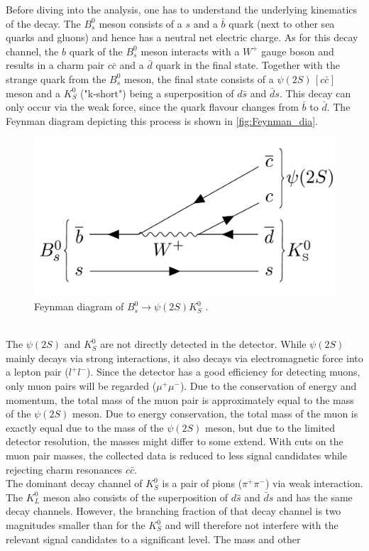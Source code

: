 Before diving into the analysis, one has to understand the underlying kinematics of the decay. The $B_s^0$ meson consists of a $s$ and a $\bar{b}$ quark (next to other sea quarks and gluons) and hence
has a neutral net electric charge. As for this decay channel, the $b$ quark of the $B_s^0$ meson interacts with a $W^+$ gauge boson and results in a charm pair $c \bar{c}$ and a $\bar{d}$ quark in the 
final state. Together with the strange quark from the $B_s^0$ meson, the final state consists of a $\psi (2S) \, [c \bar{c}]$ meson and a $K_S^0$ ("k-short") being a superposition of $d\bar{s}$ and $\bar{d}s$.
This decay can only occur via the weak force, since the quark flavour changes from $\bar{b}$ to $\bar{d}$. The Feynman diagram depicting this process is shown in \autoref{fig:Feynman_dia}.
\begin{figure}
    \centering
    \includegraphics[width = .5\textwidth]{"content/pics/Feynman.png"}
    \caption{Feynman diagram of $B_s^0 \to \psi (2S)K_S^0$ \cite{LHCb_MVA}.}
    \label{fig:Feynman_dia}
  \end{figure}
\\The $\psi (2S)$ and $K_S^0$ are not directly detected in the detector. While $\psi (2S)$ mainly decays via strong interactions, it also decays via
electromagnetic force into a lepton pair ($l^+l^-$).
Since the detector has a good efficiency for detecting muons, only muon pairs will be regarded ($\mu^+\mu^-$). Due to the conservation of energy and momentum, the 
total mass of the muon pair is approximately equal to the mass of the $\psi (2S)$ meson. Due to energy conservation, the total mass of the muon is exactly equal due to the 
mass of the $\psi (2S)$ meson, but due to the limited detector resolution, the masses might differ to some extend. With cuts on the muon pair masses, the collected data is reduced to less signal candidates while
rejecting charm resonances $c\bar{c}$.\\
The dominant decay channel of $K_S^0$ is a pair of pions ($\pi^+\pi^-$) via weak interaction. The $K_L^0$ meson also consists of the superposition of $d\bar{s}$ and $\bar{d}s$ and has the same decay channels.
However, the branching fraction of that decay channel is two magnitudes smaller than for the $K_S^0$ and will therefore not interfere with the relevant signal candidates to a significant level. The mass and other
